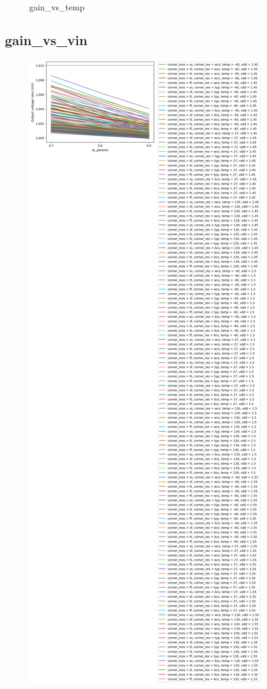 \documentclass[
  a4paper,
  DIV=11,
  numbers=noendperiod]{scrartcl}
\begin{document}
\begin{tcolorbox}
\begin{figure}[H]
{}

\caption{gain\_vs\_temp}

\end{figure}%

\subsection*{gain\_vs\_vin}\label{gain_vs_vin-1}

\begin{figure}[H]

{\centering \includegraphics{./cace/_docs/ota-improved/schematic/gain_vs_vin.png}

}
\end{figure}
\end{tcolorbox}
\end{document}
